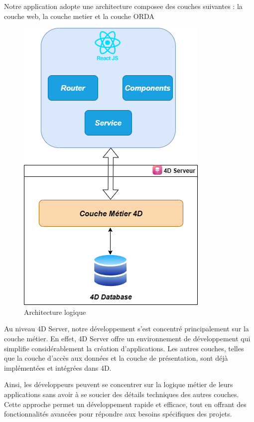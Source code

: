 Notre application adopte une architecture composee des couches suivantes : la couche web, la couche metier et la couche ORDA

\begin{figure}[htbp]
   \centering
   \includegraphics[scale=0.5]{Images/logi.png} 
   \caption{Architecture logique}
   \label{fig:logiqueArch}
\end{figure}

Au niveau 4D Server, notre développement s’est concentré principalement sur la couche métier. En effet, 4D Server offre un environnement de développement qui simplifie considérablement la création d’applications. Les autres couches, telles que la couche d’accès aux données et la couche de présentation, sont déjà implémentées et intégrées dans 4D.
\newline

Ainsi, les développeurs peuvent se concentrer sur la logique métier de leurs applications sans avoir à se soucier des détails techniques des autres couches. Cette approche permet un développement rapide et eﬀicace, tout en offrant des fonctionnalités avancées pour répondre aux besoins spécifiques des projets.
\newline

